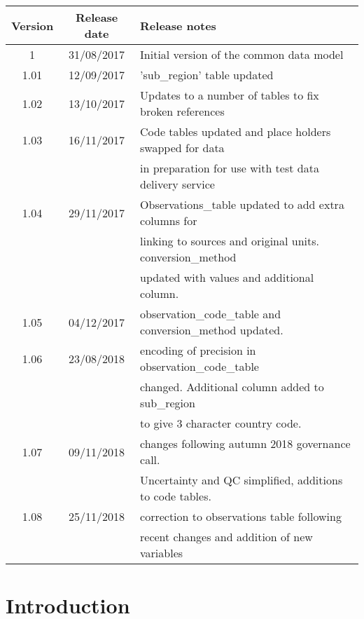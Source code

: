 \documentclass[a4paper,12pt]{article}
\begin{document}
\begin{table}[H]
\centering
\begin{tabular}{|c|c|l|}
\hline
\textbf{Version} & \textbf{Release date} & \textbf{Release notes}\\
\hline
1 & 31/08/2017 & Initial version of the common data model\\
1.01 & 12/09/2017 & 'sub\_region' table updated\\
1.02 & 13/10/2017 & Updates to a number of tables to fix broken references\\
1.03 & 16/11/2017 & Code tables updated and place holders swapped for data\\
& & in preparation for use with test data delivery service\\
1.04 & 29/11/2017 & Observations\_table updated to add extra columns for \\
& & linking to sources and original units. conversion\_method \\
& & updated with values and additional column. \\
1.05 & 04/12/2017 & observation\_code\_table and conversion\_method updated.\\
1.06 & 23/08/2018 & encoding of precision in observation\_code\_table \\
& & changed. Additional column added to sub\_region \\
& & to give 3 character country code.\\
1.07 & 09/11/2018 & changes following autumn 2018 governance call.\\ 
& & Uncertainty and QC simplified, additions to code tables.\\
1.08 & 25/11/2018 & correction to observations table following \\
& & recent changes and addition of new variables \\
\hline
\end{tabular}
\end{table}

\newpage
\tableofcontents
\newpage
\listoftables
\newpage

\section {Introduction}
\end{document}
